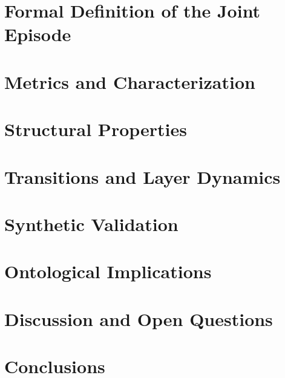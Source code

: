 \documentclass[11pt,a4paper]{article}
\begin{document}
\section{Formal Definition of the Joint Episode}


\section{Metrics and Characterization}


\section{Structural Properties}


\section{Transitions and Layer Dynamics}


\section{Synthetic Validation}


\section{Ontological Implications}


\section{Discussion and Open Questions}


\section{Conclusions}


\nocite{*}
\begingroup
\sloppy
\setlength{\emergencystretch}{5em}


\endgroup
\end{document}
